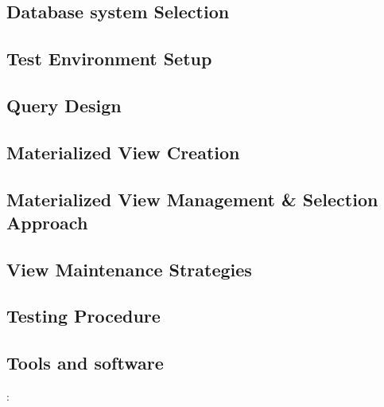 \subsection{Database system Selection}
\subsection{Test Environment Setup }
\subsection{Query Design}
\subsection{Materialized View Creation} 
\subsection{Materialized View Management \& Selection Approach}
\subsection{View Maintenance Strategies}
\subsection{Testing Procedure}
\subsection{Tools and software}: 